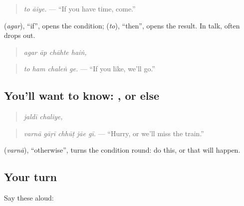 \begin{quote}
\emph{to āiye.} — \textquotedblleft{}If you have time, come.\textquotedblright{}
\end{quote}

\textbf{} (\emph{agar}), \textquotedblleft{}if\textquotedblright{}, opens the condition; \textbf{} (\emph{to}), \textquotedblleft{}then\textquotedblright{}, opens the result. In talk, \textbf{} often drops out.

\begin{quote}
\textbf{   }
\end{quote}

\begin{quote}
\emph{agar āp chāhte haiṅ,}
\end{quote}

\begin{quote}
\textbf{   }
\end{quote}

\begin{quote}
\emph{to ham chaleṅ ge.} — \textquotedblleft{}If you like, we'll go.\textquotedblright{}
\end{quote}

\subsection*{You'll want to know: , or else}
\begin{quote}
\textbf{ }
\end{quote}

\begin{quote}
\emph{jaldī chaliye,}
\end{quote}

\begin{quote}
\textbf{    }
\end{quote}

\begin{quote}
\emph{varnā gāṛī chhūṭ jāe gī.} — \textquotedblleft{}Hurry, or we'll miss the train.\textquotedblright{}
\end{quote}

\textbf{} (\emph{varnā}), \textquotedblleft{}otherwise\textquotedblright{}, turns the condition round: do this, or that will happen.

\subsection*{Your turn}
Say these aloud:

